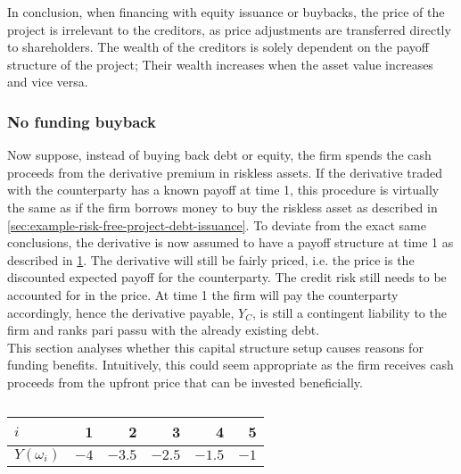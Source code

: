 \documentclass[main.tex]{subfiles}
\begin{document}
            In conclusion, when financing with equity issuance or buybacks,
            the price of the project is irrelevant to the creditors,
            as price adjustments are transferred directly to shareholders.
            The wealth of the creditors is solely dependent on the payoff structure of the project;
            Their wealth increases when the asset value increases and vice versa.

        \subsubsection{No funding buyback}
            Now suppose, instead of buying back debt or equity, 
            the firm spends the cash proceeds from the derivative premium in riskless assets. 
            If the derivative traded with the counterparty has a known payoff at time 1, this procedure is virtually the same as if the firm borrows money to buy the riskless asset 
            as described in \cref{sec:example-risk-free-project-debt-issuance}. 
            To deviate from the exact same conclusions, the derivative is now assumed to have a payoff structure at time 1 
            as described in \cref{tbl:risky-option-payoff}. 
            The derivative will still be fairly priced, i.e. the price is the discounted expected payoff for the counterparty. 
            The credit risk still needs to be accounted for in the price. 
            At time 1 the firm will pay the counterparty accordingly, hence the derivative payable, $Y_C$, 
            is still a contingent liability to the firm and ranks pari passu with the already existing debt.
            \\
            This section analyses whether this capital structure setup causes reasons for funding benefits.
            Intuitively, this could seem appropriate as the firm receives cash proceeds from the upfront price that can be invested beneficially.
            
            \begin{table}[H]
                \centering
                \begin{tabular}{l|rrrrr}
                    $i$ & 1 & 2 & 3 & 4 & 5 \\
                    \hline
                    $Y(\omega_{i})$ & $\num{-4}$ & $\num{-3.5}$ & $\num{-2.5}$ & $\num{-1.5}$ & $\num{-1}$ \\
                \end{tabular}
                \caption{}
                \label{tbl:risky-option-payoff}
            \end{table}
\end{document}
